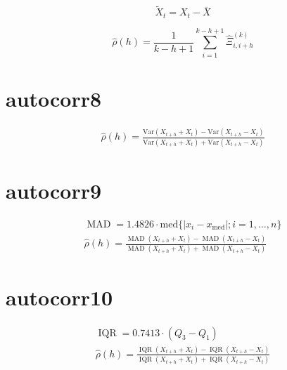 \documentclass[12pt]{mwart}
\DeclareMathOperator{\MAD}{\text{MAD}}
\DeclareMathOperator{\IQR}{\text{IQR}}
\begin{document}
\begin{equation}
	\tilde X_t=X_t - \overline{X}
\end{equation}

\begin{equation}
	\hat\rho(h)=\frac{1}{k-h+1}\displaystyle{\sum_{i=1}^{k-h+1}\hat\Xi^{(k)}_{i, i+h}}
\end{equation}
\section{autocorr8}
\begin{gather}
	\hat{\rho}(h)=\frac{\text{Var}(X_{t+h}+X_t) - \text{Var}(X_{t+h}-X_t)}{\text{Var}(X_{t+h}+X_t) + \text{Var}(X_{t+h}-X_t)}
\end{gather}
\section{autocorr9}
\begin{gather}
	\MAD=1.4826\cdot\text{med}\{|x_i-x_{\text{med}}|;i=1,\dots,n\}\\
	\hat{\rho}(h)=\frac{\MAD(X_{t+h}+X_t) - \MAD(X_{t+h}-X_t)}{\MAD(X_{t+h}+X_t) + \MAD(X_{t+h}-X_t)}
\end{gather}
\section{autocorr10}
\begin{gather}
	\IQR=0.7413\cdot(Q_3-Q_1)\\
	\hat{\rho}(h)=\frac{\IQR(X_{t+h}+X_t) - \IQR(X_{t+h}-X_t)}{\IQR(X_{t+h}+X_t) + \IQR(X_{t+h}-X_t)}
\end{gather}
\end{document}
